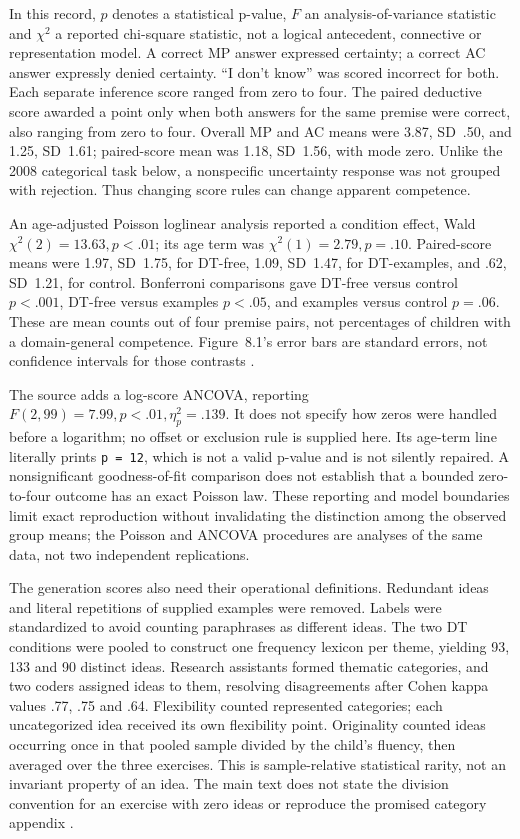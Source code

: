In this record, \(p\) denotes a statistical p-value, \(F\) an analysis-of-variance
statistic and \(\chi^2\) a reported chi-square statistic, not a logical
antecedent, connective or representation model. A correct MP answer expressed
certainty; a correct AC answer expressly denied certainty. ``I don't know''
was scored incorrect for both. Each separate inference score ranged from
zero to four. The paired deductive score awarded a point only when both
answers for the same premise were correct, also ranging from zero to four.
Overall MP and AC means were 3.87, SD~.50, and 1.25, SD~1.61;
paired-score mean was 1.18, SD~1.56, with mode zero. Unlike the 2008
categorical task below, a nonspecific uncertainty response was not grouped
with rejection. Thus changing score rules can change apparent competence.

An age-adjusted Poisson loglinear analysis reported a condition effect,
Wald \(\chi^2(2)=13.63,p<.01\); its age term was
\(\chi^2(1)=2.79,p=.10\). Paired-score means were 1.97, SD~1.75,
for DT-free, 1.09, SD~1.47, for DT-examples, and .62, SD~1.21,
for control. Bonferroni comparisons gave DT-free versus control
\(p<.001\), DT-free versus examples \(p<.05\), and examples versus
control \(p=.06\). These are mean counts out of four premise pairs,
not percentages of children with a domain-general competence. Figure~8.1's
error bars are standard errors, not confidence intervals for those contrasts
\cite[pp.~112--114]{DeChantal2021ThesisSelectedStudy}.

The source adds a log-score ANCOVA, reporting
\(F(2,99)=7.99,p<.01,\eta_p^2=.139\). It does not specify how zeros
were handled before a logarithm; no offset or exclusion rule is supplied here.
Its age-term line literally prints \texttt{p = 12}, which is not a valid
p-value and is not silently repaired. A nonsignificant goodness-of-fit
comparison does not establish that a bounded zero-to-four outcome has an
exact Poisson law. These reporting and model boundaries limit exact
reproduction without invalidating the distinction among the observed group
means; the Poisson and ANCOVA procedures are analyses of the same data,
not two independent replications.

The generation scores also need their operational definitions. Redundant
ideas and literal repetitions of supplied examples were removed. Labels
were standardized to avoid counting paraphrases as different ideas. The
two DT conditions were pooled to construct one frequency lexicon per theme,
yielding 93, 133 and 90 distinct ideas. Research assistants formed thematic
categories, and two coders assigned ideas to them, resolving disagreements
after Cohen kappa values .77, .75 and .64. Flexibility counted represented
categories; each uncategorized idea received its own flexibility point.
Originality counted ideas occurring once in that pooled sample divided by
the child's fluency, then averaged over the three exercises. This is
sample-relative statistical rarity, not an invariant property of an idea.
The main text does not state the division convention for an exercise with
zero ideas or reproduce the promised category appendix
\cite[pp.~116--119]{DeChantal2021ThesisSelectedStudy}.

